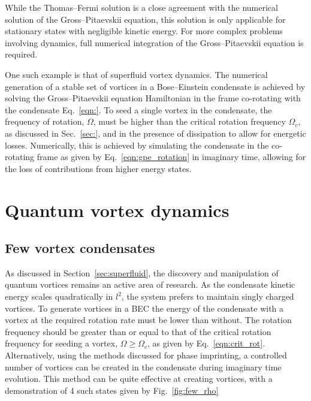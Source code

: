 While the Thomas--Fermi solution is a close agreement with the numerical solution of the Gross--Pitaevskii equation, this solution is only applicable for stationary states with negligible kinetic energy. For more complex problems involving dynamics, full numerical integration of the Gross--Pitaevskii equation is required.

One such example is that of superfluid vortex dynamics. The numerical generation of a stable set of vortices in a Bose--Einstein condensate is achieved by solving the Gross--Pitaevskii equation Hamiltonian in the frame co-rotating with the condensate Eq.~\ref{eqn:}. To seed a single vortex in the condensate, the frequency of rotation, $\Omega$, must be higher than the critical rotation frequency $\Omega_c$, as discussed in Sec.~\ref{sec:}, and in the presence of dissipation to allow for energetic losses. Numerically, this is achieved by simulating the condensate in the co-rotating frame as given by Eq.~\ref{eqn:gpe_rotation} in imaginary time, allowing for the loss of contributions from higher energy states.



\section{Quantum vortex dynamics}


\subsection{Few vortex condensates}
As discussed in Section~\ref{sec:superfluid}, the discovery and manipulation of quantum vortices remains an active area of research. As the condensate kinetic energy scales quadratically in  $l^2$, the system prefers to maintain singly charged vortices. To generate vortices in a BEC the energy of the condensate with a vortex at the required rotation rate must be lower than without. The rotation frequency should be greater than or equal to that of the critical rotation frequency for seeding a vortex, $\Omega \geq\Omega_c$, as given by Eq.~\ref{eqn:crit_rot}. Alternatively, using the methods discussed for phase imprinting, a controlled number of vortices can be created in the condensate during imaginary time evolution. This method can be quite effective at creating vortices, with a demonstration of 4 such states given by Fig.~\ref{fig:few_rho}

